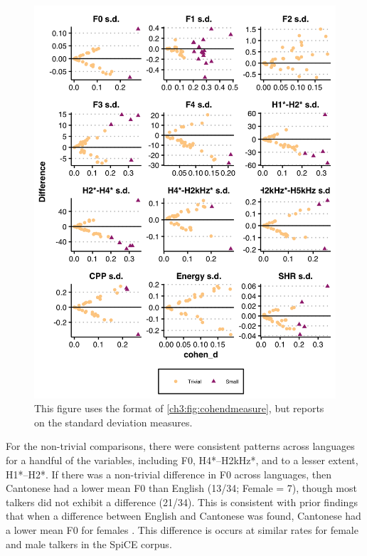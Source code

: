 \begin{figure}[htbp]
    \begin{center}
    \includegraphics[width=0.9\linewidth]{figures/ch3_cohend_part2_5in.png} 
    \caption{This figure uses the format of \ref{ch3:fig:cohendmeasure}, but reports on the standard deviation measures.}
    \label{ch3:fig:cohendsd}
    \end{center}
\end{figure}

For the non-trivial comparisons, there were consistent patterns across languages for a handful of the variables, including F0, H4*--H2kHz*, and to a lesser extent, H1*--H2*. If there was a non-trivial difference in F0 across languages, then Cantonese had a lower mean F0 than English (13/34; Female = 7), though most talkers did not exhibit a difference (21/34). This is consistent with prior findings that when a difference between English and Cantonese was found, Cantonese had a lower mean F0 for females \citep{ng_2012_ltas,altenberg_2006_f0}. This difference is occurs at similar rates for female and male talkers in the SpiCE corpus.

